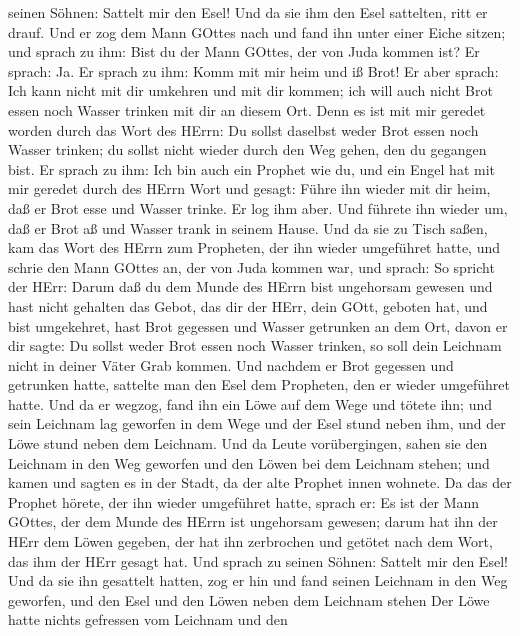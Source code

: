 seinen Söhnen: Sattelt mir den Esel! Und da sie ihm den Esel sattelten,
ritt er drauf.  Und er zog dem Mann GOttes nach und fand
ihn unter einer Eiche sitzen; und sprach zu ihm: Bist du der Mann
GOttes, der von Juda kommen ist? Er sprach: Ja.  Er sprach
zu ihm: Komm mit mir heim und iß Brot!  Er aber sprach: Ich
kann nicht mit dir umkehren und mit dir kommen; ich will auch nicht Brot
essen noch Wasser trinken mit dir an diesem Ort.  Denn es
ist mit mir geredet worden durch das Wort des HErrn: Du sollst daselbst
weder Brot essen noch Wasser trinken; du sollst nicht wieder durch den
Weg gehen, den du gegangen bist.  Er sprach zu ihm: Ich bin
auch ein Prophet wie du, und ein Engel hat mit mir geredet durch des
HErrn Wort und gesagt: Führe ihn wieder mit dir heim, daß er Brot esse
und Wasser trinke. Er log ihm aber.  Und führete ihn wieder
um, daß er Brot aß und Wasser trank in seinem Hause.  Und
da sie zu Tisch saßen, kam das Wort des HErrn zum Propheten, der ihn
wieder umgeführet hatte,  und schrie den Mann GOttes an,
der von Juda kommen war, und sprach: So spricht der HErr: Darum daß du
dem Munde des HErrn bist ungehorsam gewesen und hast nicht gehalten das
Gebot, das dir der HErr, dein GOtt, geboten hat,  und bist
umgekehret, hast Brot gegessen und Wasser getrunken an dem Ort, davon er
dir sagte: Du sollst weder Brot essen noch Wasser trinken, so soll dein
Leichnam nicht in deiner Väter Grab kommen.  Und nachdem er
Brot gegessen und getrunken hatte, sattelte man den Esel dem Propheten,
den er wieder umgeführet hatte.  Und da er wegzog, fand ihn
ein Löwe auf dem Wege und tötete ihn; und sein Leichnam lag geworfen in
dem Wege und der Esel stund neben ihm, und der Löwe stund neben dem
Leichnam.  Und da Leute vorübergingen, sahen sie den
Leichnam in den Weg geworfen und den Löwen bei dem Leichnam stehen; und
kamen und sagten es in der Stadt, da der alte Prophet innen wohnete.
 Da das der Prophet hörete, der ihn wieder umgeführet
hatte, sprach er: Es ist der Mann GOttes, der dem Munde des HErrn ist
ungehorsam gewesen; darum hat ihn der HErr dem Löwen gegeben, der hat
ihn zerbrochen und getötet nach dem Wort, das ihm der HErr gesagt hat.
 Und sprach zu seinen Söhnen: Sattelt mir den Esel! Und da
sie ihn gesattelt hatten,  zog er hin und fand seinen
Leichnam in den Weg geworfen, und den Esel und den Löwen neben dem
Leichnam stehen Der Löwe hatte nichts gefressen vom Leichnam und den
